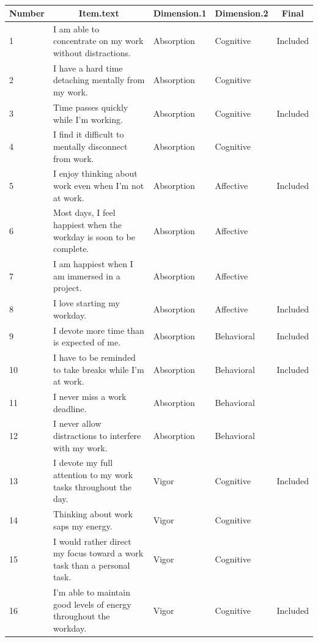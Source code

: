 \documentclass[
  english,
  man]{apa7}
\begin{document}
\begin{table}[tbp]

\begin{center}
\begin{threeparttable}

\caption{\label{tab:final}}

\begin{tabular}{lllll}
\toprule
Number & \multicolumn{1}{c}{Item.text} & \multicolumn{1}{c}{Dimension.1} & \multicolumn{1}{c}{Dimension.2} & \multicolumn{1}{c}{Final}\\
\midrule
1 & I am able to concentrate on my work without distractions. & Absorption & Cognitive & Included\\
2 & I have a hard time detaching mentally from my work. & Absorption & Cognitive & \\
3 & Time passes quickly while I'm working. & Absorption & Cognitive & Included\\
4 & I find it difficult to mentally disconnect from work. & Absorption & Cognitive & \\
5 & I enjoy thinking about work even when I'm not at work. & Absorption & Affective & Included\\
6 & Most days, I feel happiest when the workday is soon to be complete. & Absorption & Affective & \\
7 & I am happiest when I am immersed in a project. & Absorption & Affective & \\
8 & I love starting my workday. & Absorption & Affective & Included\\
9 & I devote more time than is expected of me. & Absorption & Behavioral & Included\\
10 & I have to be reminded to take breaks while I'm at work. & Absorption & Behavioral & Included\\
11 & I never miss a work deadline. & Absorption & Behavioral & \\
12 & I never allow distractions to interfere with my work. & Absorption & Behavioral & \\
13 & I devote my full attention to my work tasks throughout the day. & Vigor & Cognitive & Included\\
14 & Thinking about work saps my energy. & Vigor & Cognitive & \\
15 & I would rather direct my focus toward a work task than a personal task. & Vigor & Cognitive & \\
16 & I'm able to maintain good levels of energy throughout the workday. & Vigor & Cognitive & Included\\

\end{tabular}
\end{threeparttable}
\end{center}
\end{table}
\end{document}
